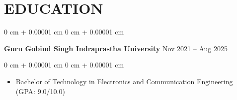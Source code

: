 \documentclass[10pt, letterpaper]{article}
\newenvironment{highlights}{
    \begin{itemize}[
        topsep=0.10 cm,
        parsep=0.10 cm,
        partopsep=0pt,
        itemsep=0pt,
        leftmargin=0 cm + 10pt
    ]
}{
    \end{itemize}
} %
\newenvironment{onecolentry}{
    \begin{adjustwidth}{
        0 cm + 0.00001 cm
    }{
        0 cm + 0.00001 cm
    }
}{
    \end{adjustwidth}
} %
\newenvironment{twocolentry}[2][]{
    \onecolentry
    \def\secondColumn{#2}
    \setcolumnwidth{\fill, 4 cm}
    \begin{paracol}{2}
}{
    \switchcolumn \raggedleft \secondColumn
    \end{paracol}
    \endonecolentry
} %
\begin{document}



    \section{EDUCATION}
        
        \begin{twocolentry}{
            Nov 2021 – Aug 2025
        }
            \textbf{Guru Gobind Singh Indraprastha University}\end{twocolentry}

        \vspace{0.10 cm}
        \begin{onecolentry}
            \begin{highlights}
                \item Bachelor of Technology in Electronics and Communication Engineering (GPA: 9.0/10.0)
            \end{highlights}
        \end{onecolentry}


\end{document}
